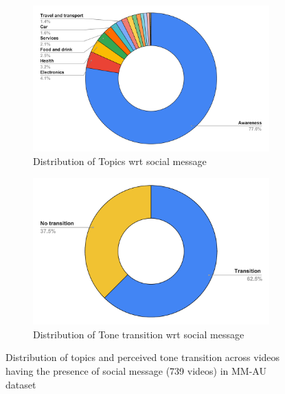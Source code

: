 \begin{figure}
\begin{subfigure}{.50\textwidth}
  \centering
  \includegraphics[width=\linewidth]{figures/topic_vs_social_message.pdf}
  \caption{Distribution of Topics wrt social message}
  \label{topic_social_message}
\end{subfigure}%
\begin{subfigure}{.50\textwidth}
  \centering
  \includegraphics[width=\linewidth]{figures/transition_vs_social_message.pdf}
  \caption{Distribution of Tone transition wrt social message}
  \label{tone_transition_social_message}
\end{subfigure}
\caption{Distribution of topics and perceived tone transition across videos having the presence of social message (739 videos) in MM-AU dataset}
\label{topic_tone_transition_social_message}
\end{figure}
